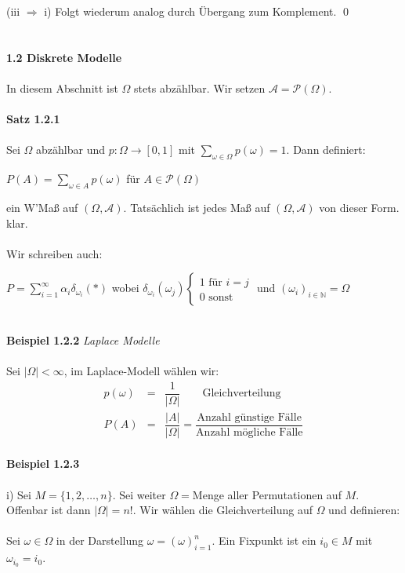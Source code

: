 \documentclass[10pt,a4paper]{report}
\numberwithin{equation}{section}
\numberwithin{figure}{section}
\theoremstyle{plain}
\theoremstyle{definition}
\theoremstyle{plain}
\theoremstyle{definition}
\theoremstyle{remark}
\theoremstyle{plain}
\theoremstyle{plain}
\theoremstyle{plain}
\newcommand{\1}{ \mathbb{1} } %
\begin{document}
(iii $\Rightarrow$ i) Folgt wiederum analog durch Übergang zum Komplement. \qed\\\\\\
\Large{\textbf{1.2 Diskrete Modelle}}\normalsize\\\\
In diesem Abschnitt ist $\Omega$ stets abzählbar. Wir setzen $\mathcal{A}=\mathcal{P}(\Omega)$.\\\\
\textbf{Satz 1.2.1}\\\\
Sei $\Omega$ abzählbar und $p: \Omega \to [0,1]$ mit $\sum\limits_{\omega \in \Omega}p(\omega)=1$. Dann definiert:
\begin{center}
$P(A)=\sum\limits_{\omega \in A} p(\omega)$ für $A\in \mathcal{P}(\Omega)$
\end{center}
ein W'Maß auf $(\Omega,\mathcal{A})$. Tatsächlich ist jedes Maß auf $(\Omega,\mathcal{A})$ von dieser Form.
\proof klar.\\\\
Wir schreiben auch:
\begin{center}
$P=\sum\limits_{i=1}^\infty \alpha_i\delta_{\omega_i}(*)$ wobei $\delta_{\omega_i}(\omega_j)
\begin{cases}
1 \text{ für } i=j\\
0 \text{ sonst}
\end{cases}$ und $(\omega_i)_{i \in \mathbb{N}}=\Omega$
\end{center}
$ $\\
\textbf{Beispiel 1.2.2} \textit{Laplace Modelle}\\\\
Sei $|\Omega|<\infty$, im Laplace-Modell wählen wir:
\begin{eqnarray*}
p(\omega)&=&\dfrac{1}{|\Omega|} \qquad \text{Gleichverteilung}\\
P(A)&=&\dfrac{|A|}{|\Omega|}=\dfrac{\text{Anzahl günstige Fälle}}{\text{Anzahl mögliche Fälle}}
\end{eqnarray*}
\\
\textbf{Beispiel 1.2.3}\\\\
i) Sei $M=\{1,2,\dots,n\}$. Sei weiter $\Omega=$Menge aller Permutationen auf $M$. Offenbar ist dann $|\Omega|=n!$. Wir wählen die Gleichverteilung auf $\Omega$ und definieren:\\\\
Sei $\omega \in \Omega$ in der Darstellung $\omega=(\omega)_{i=1}^n$. Ein Fixpunkt ist ein $i_0 \in M$ mit $\omega_{i_0}=i_0$.\\\\
\end{document}
